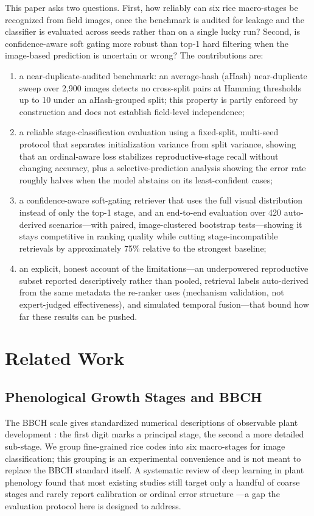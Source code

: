 \documentclass{llncs}
\begin{document}
This paper asks two questions. First, how reliably can six rice macro-stages be recognized from field images, once the benchmark is audited for leakage and the classifier is evaluated across seeds rather than on a single lucky run? Second, is confidence-aware soft gating more robust than top-1 hard filtering when the image-based prediction is uncertain or wrong? The contributions are:
\begin{enumerate}
    \item a near-duplicate-audited benchmark: an average-hash (aHash) near-duplicate sweep over 2{,}900 images detects no cross-split pairs at Hamming thresholds up to 10 under an aHash-grouped split; this property is partly enforced by construction and does not establish field-level independence;
    \item a reliable stage-classification evaluation using a fixed-split, multi-seed protocol that separates initialization variance from split variance, showing that an ordinal-aware loss stabilizes reproductive-stage recall without changing accuracy, plus a selective-prediction analysis showing the error rate roughly halves when the model abstains on its least-confident cases;
    \item a confidence-aware soft-gating retriever that uses the full visual distribution instead of only the top-1 stage, and an end-to-end evaluation over 420 auto-derived scenarios---with paired, image-clustered bootstrap tests---showing it stays competitive in ranking quality while cutting stage-incompatible retrievals by approximately 75\% relative to the strongest baseline;
    \item an explicit, honest account of the limitations---an underpowered reproductive subset reported descriptively rather than pooled, retrieval labels auto-derived from the same metadata the re-ranker uses (mechanism validation, not expert-judged effectiveness), and simulated temporal fusion---that bound how far these results can be pushed.
\end{enumerate}

\section{Related Work}

\subsection{Phenological Growth Stages and BBCH}

The BBCH scale gives standardized numerical descriptions of observable plant development \cite{meier2001bbch,lancashire1991uniform}: the first digit marks a principal stage, the second a more detailed sub-stage. We group fine-grained rice codes into six macro-stages for image classification; this grouping is an experimental convenience and is not meant to replace the BBCH standard itself. A systematic review of deep learning in plant phenology found that most existing studies still target only a handful of coarse stages and rarely report calibration or ordinal error structure \cite{katal2022deep}---a gap the evaluation protocol here is designed to address.
\end{document}
